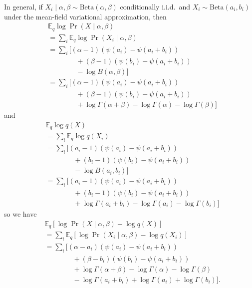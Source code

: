 \documentclass{article}
\newcommand{\Beta}{\ensuremath{\mathrm{Beta}}}
\newcommand{\Eq}{\ensuremath{\mathbb{E}_q\xspace}}
\begin{document}
In general, if $X_i \mid \alpha, \beta \sim \Beta(\alpha, \beta)$ conditionally i.i.d.\ and $X_i \sim \Beta(a_i, b_i)$ under the mean-field variational approximation, then
\begin{align*}
    &\Eq \log \Pr(X \mid \alpha, \beta) \\
    &= \sum_i \Eq \log \Pr(X_i \mid \alpha, \beta) \\
    &= \sum_i \Bigg[ (\alpha - 1) (\psi(a_i) - \psi(a_i + b_i)) \\
    &\qquad\qquad + (\beta - 1) (\psi(b_i) - \psi(a_i + b_i)) \\
    &\qquad\qquad - \log B(\alpha, \beta) \Bigg] \\
    &= \sum_i \Bigg[ (\alpha - 1) (\psi(a_i) - \psi(a_i + b_i)) \\
    &\qquad\qquad + (\beta - 1) (\psi(b_i) - \psi(a_i + b_i)) \\
    &\qquad\qquad + \log \Gamma(\alpha + \beta) - \log \Gamma(\alpha) - \log \Gamma(\beta) \Bigg]
\end{align*}
and
\begin{align*}
    &\Eq \log q(X) \\
    &= \sum_i \Eq \log q(X_i) \\
    &= \sum_i \Bigg[ (a_i - 1) (\psi(a_i) - \psi(a_i + b_i)) \\
    &\qquad\qquad + (b_i - 1) (\psi(b_i) - \psi(a_i + b_i)) \\
    &\qquad\qquad - \log B(a_i, b_i) \Bigg] \\
    &= \sum_i \Bigg[ (a_i - 1) (\psi(a_i) - \psi(a_i + b_i)) \\
    &\qquad\qquad + (b_i - 1) (\psi(b_i) - \psi(a_i + b_i)) \\
    &\qquad\qquad + \log \Gamma(a_i + b_i) - \log \Gamma(a_i) - \log \Gamma(b_i) \Bigg]
\end{align*}
so we have
\begin{align*}
    &\Eq \left[ \log \Pr(X \mid \alpha, \beta) - \log q(X) \right] \\
    &= \sum_i \Eq \left[ \log \Pr(X_i \mid \alpha, \beta) - \log q(X_i) \right] \\
    &= \sum_i \Bigg[ (\alpha - a_i) (\psi(a_i) - \psi(a_i + b_i)) \\
    &\qquad\qquad + (\beta - b_i) (\psi(b_i) - \psi(a_i + b_i)) \\
    &\qquad\qquad + \log \Gamma(\alpha + \beta) - \log \Gamma(\alpha) - \log \Gamma(\beta) \\
    &\qquad\qquad - \log \Gamma(a_i + b_i) + \log \Gamma(a_i) + \log \Gamma(b_i) \Bigg] .
\end{align*}
\end{document}
